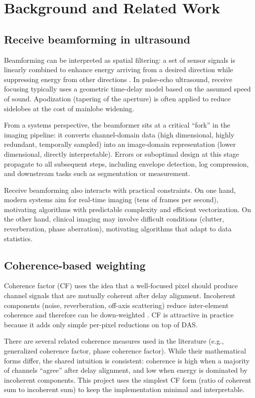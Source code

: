 \documentclass[conference]{IEEEtran}
\begin{document}
\section{Background and Related Work}
\subsection{Receive beamforming in ultrasound}
Beamforming can be interpreted as spatial filtering: a set of sensor signals is linearly combined to enhance energy arriving from a desired direction while suppressing energy from other directions \cite{vanveen1988beamforming}. In pulse-echo ultrasound, receive focusing typically uses a geometric time-delay model based on the assumed speed of sound. Apodization (tapering of the aperture) is often applied to reduce sidelobes at the cost of mainlobe widening.

From a systems perspective, the beamformer sits at a critical ``fork'' in the imaging pipeline: it converts channel-domain data (high dimensional, highly redundant, temporally sampled) into an image-domain representation (lower dimensional, directly interpretable). Errors or suboptimal design at this stage propagate to all subsequent steps, including envelope detection, log compression, and downstream tasks such as segmentation or measurement.

Receive beamforming also interacts with practical constraints. On one hand, modern systems aim for real-time imaging (tens of frames per second), motivating algorithms with predictable complexity and efficient vectorization. On the other hand, clinical imaging may involve difficult conditions (clutter, reverberation, phase aberration), motivating algorithms that adapt to data statistics.

\subsection{Coherence-based weighting}
Coherence factor (CF) uses the idea that a well-focused pixel should produce channel signals that are mutually coherent after delay alignment. Incoherent components (noise, reverberation, off-axis scattering) reduce inter-element coherence and therefore can be down-weighted \cite{mallart1994adaptive}. CF is attractive in practice because it adds only simple per-pixel reductions on top of DAS.

There are several related coherence measures used in the literature (e.g., generalized coherence factor, phase coherence factor). While their mathematical forms differ, the shared intuition is consistent: coherence is high when a majority of channels ``agree'' after delay alignment, and low when energy is dominated by incoherent components. This project uses the simplest CF form (ratio of coherent sum to incoherent sum) to keep the implementation minimal and interpretable.
\end{document}
